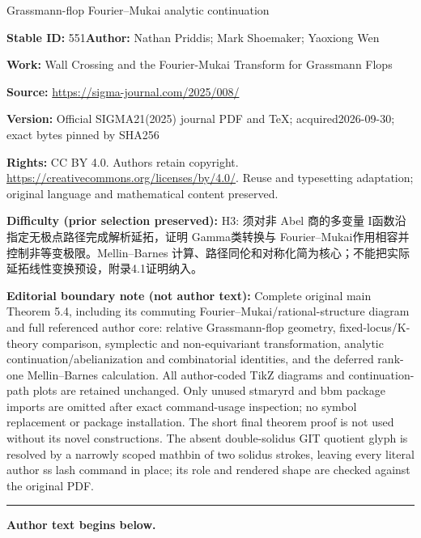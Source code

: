 \documentclass[11pt]{article}
\numberwithin{equation}{section}
\numberwithin{equation}{section}
\begin{document}
\begin{center}\Large Grassmann-flop Fourier–Mukai analytic continuation\end{center}
\noindent\textbf{Stable ID:} 551\quad\textbf{Author:} Nathan Priddis; Mark Shoemaker; Yaoxiong Wen\par
\noindent\textbf{Work:} Wall Crossing and the Fourier-Mukai Transform for Grassmann Flops\par
\noindent\textbf{Source:} \url{https://sigma-journal.com/2025/008/}\par
\noindent\textbf{Version:} Official SIGMA21(2025) journal PDF and TeX; acquired2026-09-30; exact bytes pinned by SHA256\par
\noindent\textbf{Rights:} CC BY 4.0. Authors retain copyright. \url{https://creativecommons.org/licenses/by/4.0/}. Reuse and typesetting adaptation; original language and mathematical content preserved.\par
\noindent\textbf{Difficulty (prior selection preserved):} {\CJKfont H3: 须对非 Abel 商的多变量 I函数沿指定无极点路径完成解析延拓，证明 Gamma类转换与 Fourier–Mukai作用相容并控制非等变极限。Mellin–Barnes 计算、路径同伦和对称化简为核心；不能把实际延拓线性变换预设，附录4.1证明纳入。}\par
\medskip\noindent\textbf{Editorial boundary note (not author text):} Complete original main Theorem 5.4, including its commuting Fourier–Mukai/rational-structure diagram and full referenced author core: relative Grassmann-flop geometry, fixed-locus/K-theory comparison, symplectic and non-equivariant transformation, analytic continuation/abelianization and combinatorial identities, and the deferred rank-one Mellin–Barnes calculation. All author-coded TikZ diagrams and continuation-path plots are retained unchanged. Only unused stmaryrd and bbm package imports are omitted after exact command-usage inspection; no symbol replacement or package installation. The short final theorem proof is not used without its novel constructions. The absent double-solidus GIT quotient glyph is resolved by a narrowly scoped mathbin of two solidus strokes, leaving every literal author ss lash command in place; its role and rendered shape are checked against the original PDF.\par
\medskip\hrule\medskip\noindent\textbf{Author text begins below.}\par
\setcounter{section}{1}
\end{document}
